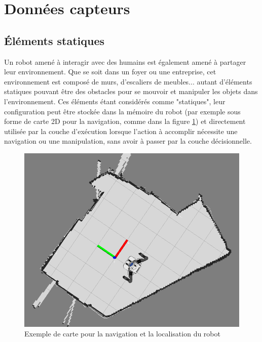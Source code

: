 \documentclass[a4paper,11pt,twoside]{StyleThese}
\begin{document}


\section{Données capteurs}
\label{sec:collecte}
\subsection{Éléments statiques}
Un robot amené à interagir avec des humains est également amené à partager leur environnement. Que se soit dans un foyer ou une entreprise, cet environnement est composé de murs, d'escaliers de meubles... autant d'éléments statiques pouvant être des obstacles pour se mouvoir et manipuler les objets dans l'environnement. Ces éléments étant considérés comme "statiques", leur configuration peut être stockée dans la mémoire du robot (par exemple sous forme de carte 2D pour la navigation, comme dans la figure \ref{fig:map}) et directement utilisée par la couche d'exécution lorsque l'action à accomplir nécessite une navigation ou une manipulation, sans avoir à passer par la couche décisionnelle.

\begin{figure}[ht!]
 \centering
  \includegraphics[width=0.59\linewidth]{./img/Map2d.png} 
  \caption {Exemple de carte pour la navigation et la localisation du robot}
  \label{fig:map}
\end{figure}
\end{document}
